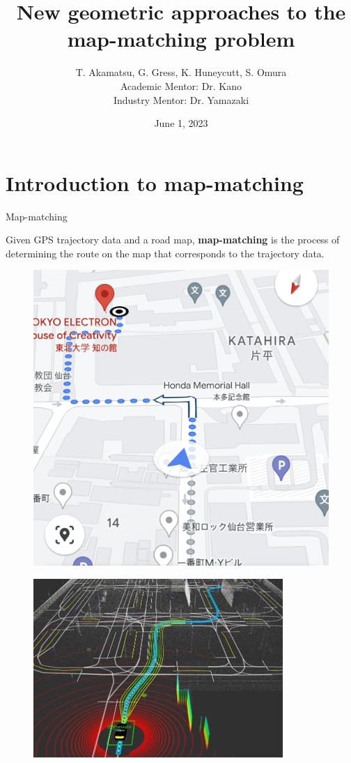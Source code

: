 \documentclass[aspectratio=169, bigfiles, professionalfonts, hyperref={colorlinks=true, allcolors=., urlcolor=blue}]{beamer}
\title[Mitsubishi A]{\vspace{8em}New geometric approaches to the map-matching problem}
\author[T. Akamatsu, G. Gress, K. Huneycutt, S. Omura]{T. Akamatsu, G. Gress, K. Huneycutt, S. Omura \\
Academic Mentor: Dr. Kano \\
Industry Mentor: Dr. Yamazaki}
\date{June 1, 2023} %
\begin{document}
\maketitle

\section{Introduction to map-matching}
\begin{frame}{Map-matching}
    
Given GPS trajectory data and a road map, \textbf{map-matching} is the process of
determining the route on the map that corresponds to the trajectory data.\\ 
\begin{figure}
\centering
\begin{minipage}{.5\textwidth}
\centering
  \includegraphics[scale=.1]{googlemaps.png}
  \label{fig:test1}
\end{minipage}%
\begin{minipage}{.5\textwidth}
\centering
  \includegraphics[scale=.48]{selfdriving.jpeg}
  \label{fig:test2}
\end{minipage}
\end{figure}
\end{frame}
\end{document}
